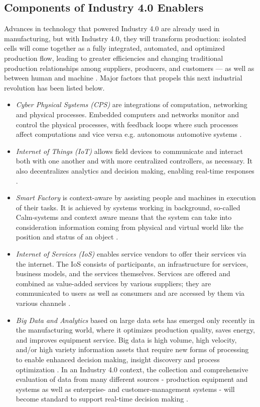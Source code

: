 \subsection{Components of Industry 4.0 Enablers}
Advances in technology that powered Industry 4.0 are already used in manufacturing, but with Industry 4.0, they will transform production: isolated cells will come together as a fully integrated, automated, and optimized production flow, leading to greater efficiencies and changing traditional production relationships among suppliers, producers, and customers — as well as between human and machine \cite{IN4BCG}. Major factors that propels this next industrial revolution has been listed below.
\begin{itemize}
\item \textit{Cyber Physical Systems (\acs{CPS})}  are integrations of computation, networking and physical processes. Embedded computers and networks monitor and control the physical processes, with feedback loops where such processes affect computations and vice versa e.g. autonomous automotive systems \cite{IN4DESIGN}.
\item \textit{Internet of Things (\acs{IoT})}  allows field devices to communicate and interact both with one another and with more centralized controllers, as necessary. It also decentralizes analytics and decision making, enabling real-time responses \cite{IN4BCG,IN4DESIGN}.
\item \textit{Smart Factory} is context-aware by assisting people and machines in execution of their tasks. It is achieved by systems working in background, so-called Calm-systems and context aware means that the system can take into consideration information coming 	from physical and virtual world like the position and status of an object \cite{IN4DESIGN}.
\item \textit{Internet of Services (\acs{IoS})} enables service vendors to offer their services via the internet. The \acs{IoS} consists of participants, an infrastructure for services, business models, and the services themselves. Services are offered and combined as value-added services by various suppliers; they are communicated to users as well as consumers and are accessed by them via various channels \cite{IN4DESIGN}.
\item \textit{Big Data and Analytics} based on large data sets has emerged only recently in the manufacturing world, where it optimizes production quality, saves energy, and improves equipment service. Big data is high volume, high velocity, and/or high variety information assets that require new forms of processing to enable enhanced decision making, insight discovery and process optimization \cite{BIGDATA}. In an Industry 4.0 context, the collection and comprehensive evaluation of data from many different sources - production equipment and systems as well as enterprise- and customer-management systems - will become standard to support real-time decision making \cite{IN4BCG,IN4DESIGN}.

\end{itemize}
